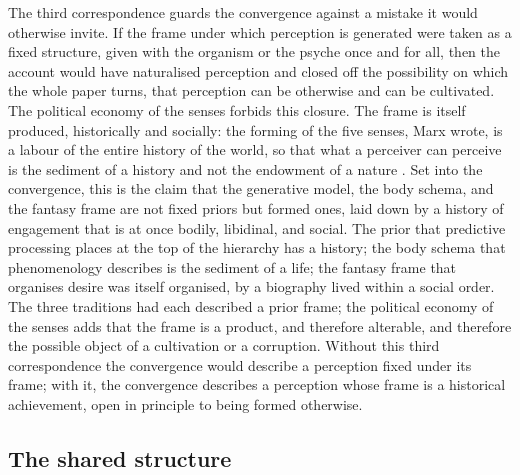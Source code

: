 The third correspondence guards the convergence against a mistake it would otherwise invite. If the frame under which perception is generated were taken as a fixed structure, given with the organism or the psyche once and for all, then the account would have naturalised perception and closed off the possibility on which the whole paper turns, that perception can be otherwise and can be cultivated. The political economy of the senses forbids this closure. The frame is itself produced, historically and socially: the forming of the five senses, Marx wrote, is a labour of the entire history of the world, so that what a perceiver can perceive is the sediment of a history and not the endowment of a nature \parencite{marx1844}. Set into the convergence, this is the claim that the generative model, the body schema, and the fantasy frame are not fixed priors but formed ones, laid down by a history of engagement that is at once bodily, libidinal, and social. The prior that predictive processing places at the top of the hierarchy has a history; the body schema that phenomenology describes is the sediment of a life; the fantasy frame that organises desire was itself organised, by a biography lived within a social order. The three traditions had each described a prior frame; the political economy of the senses adds that the frame is a product, and therefore alterable, and therefore the possible object of a cultivation or a corruption. Without this third correspondence the convergence would describe a perception fixed under its frame; with it, the convergence describes a perception whose frame is a historical achievement, open in principle to being formed otherwise.

\subsection{The shared structure}
\label{p23:sub:conv-structure}

